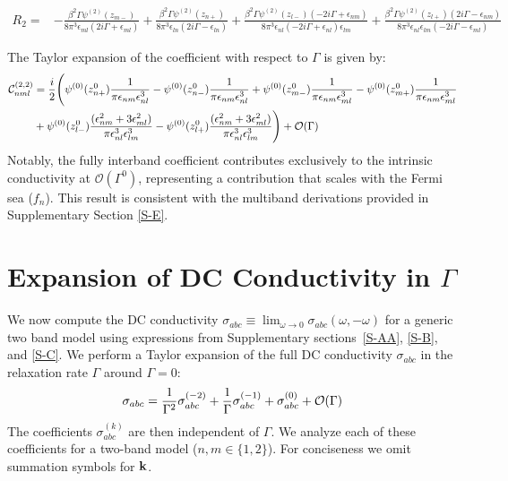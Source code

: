 \documentclass[twocolumn, prx, reprint, amsfonts, amsmath, amssymb, longbibliography, floatfix, aps]{revtex4-2}
\begin{document}
\begin{equation}
	\begin{aligned}
		R_2 = & -\frac{\beta^2 \Gamma \psi^{(2)}(z_{m-})}{8 \pi^3 \epsilon_{ml} (2 i \Gamma + \epsilon_{ml})} + \frac{\beta^2 \Gamma \psi^{(2)}(z_{n+})}{8 \pi^3 \epsilon_{ln} (2 i \Gamma - \epsilon_{ln})} 
		+ \frac{\beta^2 \Gamma \psi^{(2)}(z_{l-}) (-2 i \Gamma + \epsilon_{nm})}{8 \pi^3 \epsilon_{nl} (-2 i \Gamma + \epsilon_{nl}) \epsilon_{lm}} + \frac{\beta^2 \Gamma \psi^{(2)}(z_{l+}) (2 i \Gamma - \epsilon_{nm})}{8 \pi^3 \epsilon_{nl} \epsilon_{lm} (-2 i \Gamma - \epsilon_{ml})}
	\end{aligned}
\end{equation}

The Taylor expansion of the coefficient with respect to $\Gamma$ is given by:
\begin{equation}
	\begin{aligned}
		{\cal C}_{nml}^{(2, 2)} &= \frac{i}{2} \Bigg( \psi^{(0)}(z_{n+}^0) \frac{1}{\pi \epsilon_{nm} \epsilon_{nl}^3} - \psi^{(0)}(z_{n-}^0) \frac{1}{\pi \epsilon_{nm} \epsilon_{nl}^3}
		+ \psi^{(0)}(z_{m-}^0) \frac{1}{\pi \epsilon_{nm} \epsilon_{ml}^3} - \psi^{(0)}(z_{m+}^0) \frac{1}{\pi \epsilon_{nm} \epsilon_{ml}^3} \\
		& + \psi^{(0)}(z_{l-}^0) \frac{(\epsilon_{nm}^2 + 3 \epsilon_{ml}^2)}{\pi \epsilon_{nl}^3 \epsilon_{lm}^3} - \psi^{(0)}(z_{l+}^0) \frac{(\epsilon_{nm}^2 + 3 \epsilon_{ml}^2)}{\pi \epsilon_{nl}^3 \epsilon_{lm}^3} \Bigg) + \mathcal{O}(\Gamma)
	\end{aligned}
\end{equation}
Notably, the fully interband coefficient contributes exclusively to the intrinsic conductivity at $\mathcal{O}(\Gamma^0)$, representing a contribution that scales with the Fermi sea ($f_n$). This result is consistent with the multiband derivations provided in Supplementary Section \ref{S-E}.




\section{Expansion of DC Conductivity in \texorpdfstring{$\Gamma$}{Gamma}}
\label{S-D}

We now compute the DC conductivity $\sigma_{abc} \equiv \lim_{\omega \to 0} \sigma_{abc}(\omega, -\omega)$ for a generic two band model using expressions from Supplementary sections~\ref{S-AA}, \ref{S-B}, and \ref{S-C}. We perform a Taylor expansion of the full DC conductivity $\sigma_{abc}$ in the relaxation rate $\Gamma$ around $\Gamma=0$:
\begin{align}
\begin{aligned}
\sigma_{abc} = \frac{1}{\Gamma^2}\sigma_{abc}^{(-2)} + \frac{1}{\Gamma}\sigma_{abc}^{(-1)} + \sigma_{abc}^{(0)} + {\cal O}(\Gamma)
\end{aligned}
\end{align}
The coefficients $\sigma_{abc}^{(k)}$ are then independent of $\Gamma$. We analyze each of these coefficients for a two-band model ($n, m \in \{1, 2\}$). For conciseness we omit summation symbols for ${\bf k}$.
\end{document}
